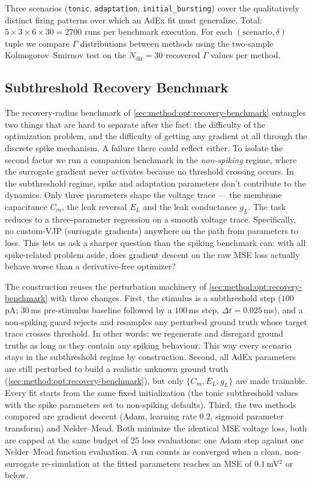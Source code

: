 Three scenarios (\texttt{tonic}, \texttt{adaptation}, \texttt{initial\_bursting}) cover the qualitatively distinct firing patterns over which an \gls{AdEx} fit must generalize.
Total: $5 \times 3 \times 6 \times 30 = 2700$ runs per benchmark execution.
For each $(\text{scenario}, \delta)$ tuple we compare $\Gamma$ distributions between methods using the two-sample Kolmogorov--Smirnov test on the $N_{\text{dir}} = 30$ recovered $\Gamma$ values per method.

\subsection{Subthreshold Recovery Benchmark}\label{sec:method:opt:subthreshold-benchmark}
The recovery-radius benchmark of \cref{sec:method:opt:recovery-benchmark} entangles two things that are hard to separate after the fact:
the difficulty of the optimization problem, and the difficulty of getting any gradient at all through the discrete spike mechanism.
A failure there could reflect either.
To isolate the second factor we run a companion benchmark in the \emph{non-spiking} regime, where the surrogate gradient never activates because no threshold crossing occurs.
In the subthreshold regime, spike and adaptation parameters don't contribute to the dynamics.
Only three parameters shape the voltage trace --- the membrane capacitance $C_m$, the leak reversal $E_L$ and the leak conductance $g_L$.
The task reduces to a three-parameter regression on a smooth voltage trace.
Specifically, no custom-VJP (surrogate gradients) anywhere on the path from parameters to loss.
This lets us ask a sharper question than the spiking benchmark can:
with all spike-related problem aside, does gradient descent on the raw \gls{MSE} loss actually behave worse than a derivative-free optimizer?

The construction reuses the perturbation machinery of \cref{sec:method:opt:recovery-benchmark} with three changes.
First, the stimulus is a subthreshold step ($100$\,pA; $30$\,ms pre-stimulus baseline followed by a $100$\,ms step, $\Delta t = 0.025$\,ms),
and a non-spiking guard rejects and resamples any perturbed ground truth whose target trace crosses threshold.
In other words: we regenerate and disregard ground truths as long as they contain any spiking behaviour.
This way every scenario stays in the subthreshold regime by construction.
Second, all \gls{AdEx} parameters are still perturbed to build a realistic unknown ground truth (\cref{sec:method:opt:recovery-benchmark}),
but only $\{C_m, E_L, g_L\}$ are made trainable.
Every fit starts from the same fixed initialization (the tonic subthreshold values with the spike parameters set to non-spiking defaults).
Third, the two methods compared are gradient descent (Adam, learning rate $0.2$, sigmoid parameter transform) and Nelder--Mead.
Both minimize the identical \gls{MSE} voltage loss, both are capped at the same budget of $25$ loss evaluations: one Adam step against one Nelder--Mead function evaluation.
A run counts as converged when a clean, non-surrogate re-simulation at the fitted parameters reaches an \gls{MSE} of $0.1$\,mV$^2$ or below.

